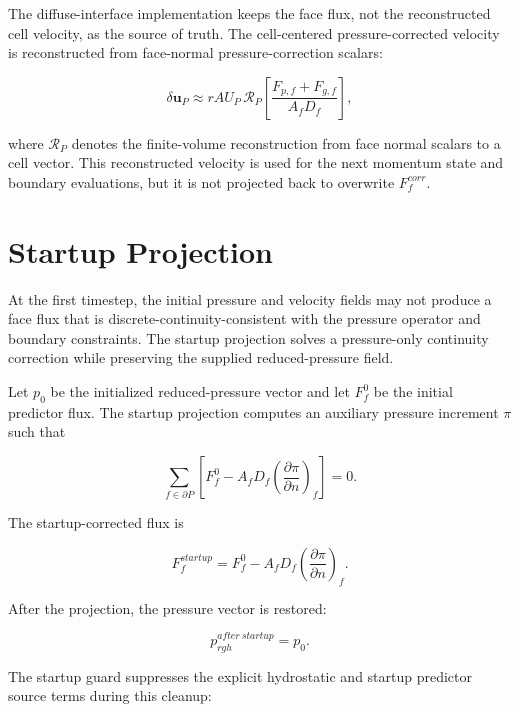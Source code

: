 \documentclass[11pt]{article}
\begin{document}
The diffuse-interface implementation keeps the face flux, not the reconstructed
cell velocity, as the source of truth.  The cell-centered pressure-corrected
velocity is reconstructed from face-normal pressure-correction scalars:

\begin{equation}
  \delta\mathbf{u}_P
  \approx
  rAU_P\,
  \mathcal{R}_P
  \left[
    \frac{F_{p,f}+F_{g,f}}{A_fD_f}
  \right],
  \label{eq:velocity-writeback}
\end{equation}

where \(\mathcal{R}_P\) denotes the finite-volume reconstruction from face
normal scalars to a cell vector.  This reconstructed velocity is used for the
next momentum state and boundary evaluations, but it is not projected back to
overwrite \(F_f^{corr}\).

\section{Startup Projection}

At the first timestep, the initial pressure and velocity fields may not produce
a face flux that is discrete-continuity-consistent with the pressure operator
and boundary constraints.  The startup projection solves a pressure-only
continuity correction while preserving the supplied reduced-pressure field.

Let \(p_0\) be the initialized reduced-pressure vector and let \(F_f^0\) be the
initial predictor flux.  The startup projection computes an auxiliary pressure
increment \(\pi\) such that

\begin{equation}
  \sum_{f\in\partial P}
  \left[
    F_f^0
    -
    A_fD_f
    \left(\frac{\partial\pi}{\partial n}\right)_f
  \right]
  =
  0.
  \label{eq:startup-projection}
\end{equation}

The startup-corrected flux is

\begin{equation}
  F_f^{startup}
  =
  F_f^0
  -
  A_fD_f
  \left(\frac{\partial\pi}{\partial n}\right)_f.
\end{equation}

After the projection, the pressure vector is restored:

\begin{equation}
  p_{rgh}^{after\ startup}=p_0.
\end{equation}

The startup guard suppresses the explicit hydrostatic and startup predictor
source terms during this cleanup:
\end{document}
